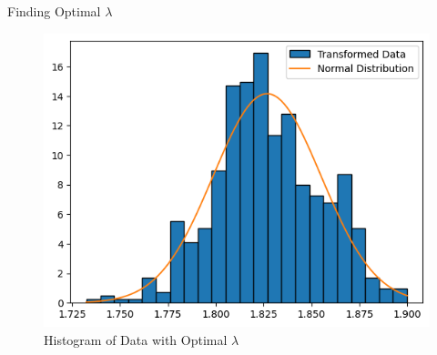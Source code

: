 \begin{frame}{Finding Optimal $\lambda$}

  \begin{figure}
    \centering
    \includegraphics[width=0.8\linewidth]{../Report/images/optimal-hist.png}
    \caption{Histogram of Data with Optimal $\lambda$}
  \end{figure}
  
\end{frame}
